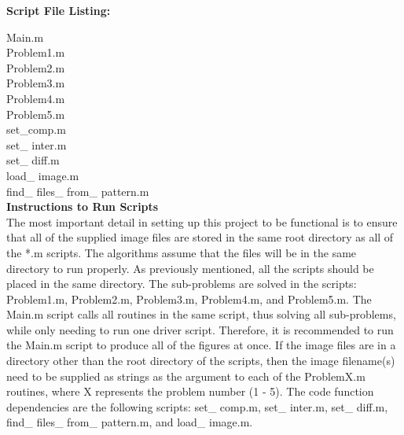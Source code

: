 \documentclass[./rarnold_project_89.tex]{subfiles}
\begin{document}
\noindent \textbf{Script File Listing:}

\noindent Main.m \\
Problem1.m \\
Problem2.m \\
Problem3.m \\
Problem4.m \\
Problem5.m \\
set\_comp.m \\
set\_ inter.m \\
set\_ diff.m \\
load\_ image.m \\
find\_ files\_ from\_ pattern.m \\

\noindent \textbf{Instructions to Run Scripts} \\

\noindent The most important detail in setting up this project to be functional is to ensure that all of the supplied image files are stored in the same root directory as all of the *.m scripts.  The algorithms assume that the files will be in the same directory to run properly.  As previously mentioned, all the scripts should be placed in the same directory.  The sub-problems are solved in the scripts: Problem1.m, Problem2.m, Problem3.m, Problem4.m, and Problem5.m.  The Main.m script calls all routines in the same script, thus solving all sub-problems, while only needing to run one driver script.  Therefore, it is recommended to run the Main.m script to produce all of the figures at once.  If the image files are in a directory other than the root directory of the scripts, then the image filename(s) need to be supplied as strings as the argument to each of the ProblemX.m routines, where X represents the problem number (1 - 5).  The code function dependencies are the following scripts: set\_ comp.m, set\_ inter.m, set\_ diff.m, find\_ files\_ from\_ pattern.m, and load\_ image.m.
\end{document}
